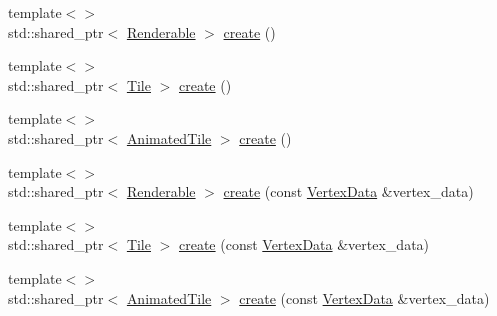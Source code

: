 \begin{DoxyCompactItemize}
\item 
{\footnotesize template$<$$>$ }\\std\+::shared\+\_\+ptr$<$ \hyperlink{class_graphics_1_1_renderable}{Renderable} $>$ \hyperlink{class_graphics_1_1_renderable_factory_a589bdf269f560834104518482cb7f49c}{create} ()
\item 
{\footnotesize template$<$$>$ }\\std\+::shared\+\_\+ptr$<$ \hyperlink{class_graphics_1_1_tile}{Tile} $>$ \hyperlink{class_graphics_1_1_renderable_factory_a38c0da2947f41201d69fbde65430d859}{create} ()
\item 
{\footnotesize template$<$$>$ }\\std\+::shared\+\_\+ptr$<$ \hyperlink{class_graphics_1_1_animated_tile}{Animated\+Tile} $>$ \hyperlink{class_graphics_1_1_renderable_factory_a618735c8b4ee8ca099974211bac5c2ad}{create} ()
\item 
{\footnotesize template$<$$>$ }\\std\+::shared\+\_\+ptr$<$ \hyperlink{class_graphics_1_1_renderable}{Renderable} $>$ \hyperlink{class_graphics_1_1_renderable_factory_a5e3db739ae2aa08a42aeff57c3270554}{create} (const \hyperlink{class_graphics_1_1_vertex_data}{Vertex\+Data} \&vertex\+\_\+data)
\item 
{\footnotesize template$<$$>$ }\\std\+::shared\+\_\+ptr$<$ \hyperlink{class_graphics_1_1_tile}{Tile} $>$ \hyperlink{class_graphics_1_1_renderable_factory_ada89b5ddcb66665e89c64837d2e3f0a0}{create} (const \hyperlink{class_graphics_1_1_vertex_data}{Vertex\+Data} \&vertex\+\_\+data)
\item 
{\footnotesize template$<$$>$ }\\std\+::shared\+\_\+ptr$<$ \hyperlink{class_graphics_1_1_animated_tile}{Animated\+Tile} $>$ \hyperlink{class_graphics_1_1_renderable_factory_aa01ea09b848a60069b32135e75ff2fda}{create} (const \hyperlink{class_graphics_1_1_vertex_data}{Vertex\+Data} \&vertex\+\_\+data)
\end{DoxyCompactItemize}
